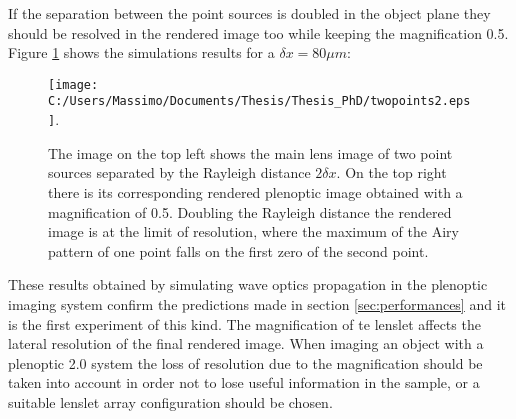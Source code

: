 If the separation between the point sources is doubled in the object plane they should be resolved in the rendered image too while keeping the magnification 0.5. Figure \ref{fig:twopoint2} shows the simulations results for a $\delta x = 80 \mu m$:
\begin{figure}[H]
	\centering
	\texttt{[image: C:/Users/Massimo/Documents/Thesis/Thesis\_PhD/twopoints2.eps]}.
	\caption{\label{fig:twopoint2} The image on the top left shows  the main lens image of two point sources separated by the Rayleigh distance $2\delta x$. On the top right there is its corresponding rendered plenoptic image obtained with a magnification of 0.5. Doubling the Rayleigh distance the rendered image is at the limit of resolution, where the maximum of the Airy pattern of one point falls on the first zero of the second point. }
\end{figure}
These results obtained by simulating wave optics propagation in the plenoptic imaging system confirm the predictions made in section \ref{sec:performances} and it is the first experiment of this kind. The magnification of te lenslet affects the lateral resolution of the final rendered image. When imaging an object with a plenoptic 2.0 system the loss of resolution due to the magnification should be taken into account in order not to lose useful information in the sample, or a suitable lenslet array configuration should be chosen.
